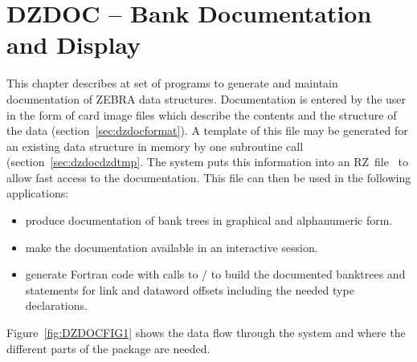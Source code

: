 
\chapter{DZDOC -- Bank Documentation and Display}
\label{sec:dzdocdescription}
 
This chapter describes at set of programs
to generate and maintain documentation of ZEBRA data structures.
Documentation is entered by the user in the form of card image files which
describe the contents and the structure of the data (section~\ref{sec:dzdocformat}).
A template of this file may be generated for an existing data structure
in memory by one subroutine call (section~\ref{sec:dzdocdzdtmp}.
The system puts this information into an RZ~file~\cite{bib-ZEBRARZ}
to allow fast access to the documentation. 
This file can then be used in the following applications:
 
\begin{itemize}
\item produce documentation of bank trees in graphical and alphanumeric
      form.
\item make the documentation available in an interactive session.
\item generate Fortran code with calls to /
      to build the documented banktrees and  statements 
      for link and dataword offsets including the needed type declarations.
\end{itemize}
 
Figure~\ref{fig:DZDOCFIG1} shows the data flow through the 
 system and where the different parts of the package are needed.
 
